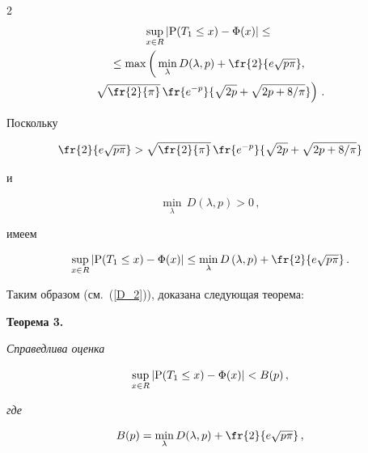 \begin{multicols}{2}
\begin{multline*}
\sup\limits_{x \in R} |\P(T_1 \leq x) - \IP(x)| \leq{}\\

{}\leq

\max\left(\vphantom{\fr{e^{-p}}{\sqrt{2}}}

\min_{\lambda} D(\lambda,p) + \fr{2}{e\sqrt{p \pi}},\,{}\right.\\

\left.\sqrt{\fr{2}{\pi}}\, \fr{e^{-p}}{\sqrt{2p}+\sqrt{2p + 8/\pi}}\right)\,.

\end{multline*}

Поскольку       

$$

\fr{2}{e\sqrt{p \pi}} > \sqrt{\fr{2}{\pi}}\, \fr{e^{-p}}{\sqrt{2p}+\sqrt{2p + 8/\pi}}

$$

и 

$$\min\limits_{\lambda} \,D(\lambda,p) >0\,,

$$ 

имеем

\begin{equation*}

\sup\limits_{x \in R} |\P(T_1 \le x) - \IP(x)| \leq \underset{\lambda}{\min}\,D\left(\lambda,p\right)

+ \fr{2}{e\sqrt{p \pi}}\,.

\end{equation*}



Таким образом (см.~(\ref{D_2})), доказана следующая теорема:



\smallskip



\noindent

\textbf{Теорема 3.} %

\textit{Справедлива оценка}

\begin{equation*}

\sup\limits_{x \in R}|\P(T_1 \leq x) - \IP(x) | <B(p)\,,

\end{equation*}

\textit{где}

\begin{equation}

B(p)= \underset{\lambda}{\min}\,D(\lambda,p) + \fr{2}{e\sqrt{p \pi}}\,, 

\label{eq.11}


\end{equation}
\end{multicols}
